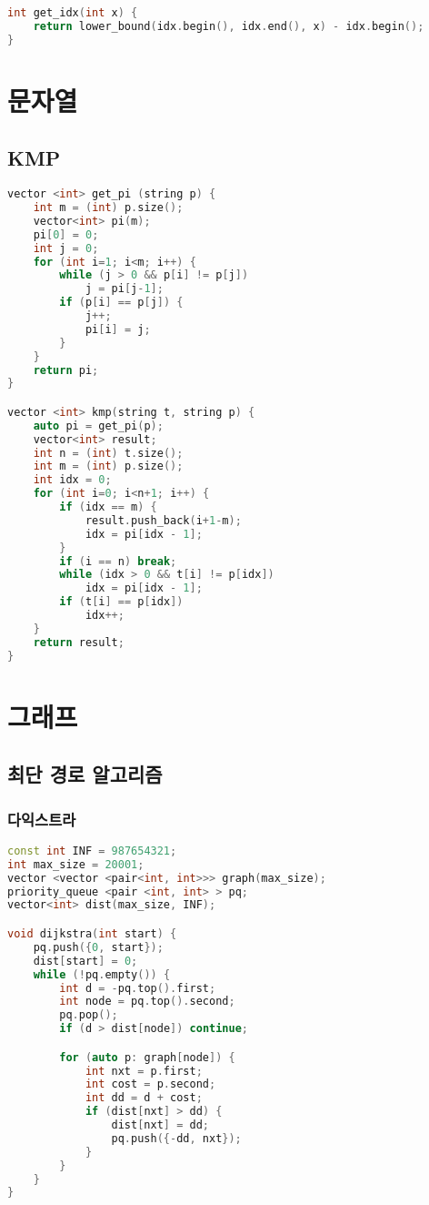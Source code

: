 \documentclass[]{article}
\begin{document}
\begin{multicols*}{2}
\begin{lstlisting}[language=c++]
int get_idx(int x) {
    return lower_bound(idx.begin(), idx.end(), x) - idx.begin();
}
\end{lstlisting}
\section{문자열}
\subsection{KMP}
\begin{lstlisting}[language=c++]
vector <int> get_pi (string p) {
    int m = (int) p.size();
    vector<int> pi(m);
    pi[0] = 0;
    int j = 0;
    for (int i=1; i<m; i++) {
        while (j > 0 && p[i] != p[j])
            j = pi[j-1];
        if (p[i] == p[j]) {
            j++;
            pi[i] = j;
        }
    }
    return pi;
}

vector <int> kmp(string t, string p) {
    auto pi = get_pi(p);
    vector<int> result;
    int n = (int) t.size();
    int m = (int) p.size();
    int idx = 0;
    for (int i=0; i<n+1; i++) {
        if (idx == m) {
            result.push_back(i+1-m);
            idx = pi[idx - 1];
        }
        if (i == n) break;
        while (idx > 0 && t[i] != p[idx])
            idx = pi[idx - 1];
        if (t[i] == p[idx])
            idx++;
    }
    return result;
}
\end{lstlisting}
\vskip 40mm
\columnbreak
\section{그래프}
\subsection{최단 경로 알고리즘}
\subsubsection{다익스트라}
\begin{lstlisting}[language=c++]
const int INF = 987654321;
int max_size = 20001;
vector <vector <pair<int, int>>> graph(max_size);
priority_queue <pair <int, int> > pq;
vector<int> dist(max_size, INF);

void dijkstra(int start) {
    pq.push({0, start});
    dist[start] = 0;
    while (!pq.empty()) {
        int d = -pq.top().first;
        int node = pq.top().second;
        pq.pop();
        if (d > dist[node]) continue;

        for (auto p: graph[node]) {
            int nxt = p.first;
            int cost = p.second;
            int dd = d + cost;
            if (dist[nxt] > dd) {
                dist[nxt] = dd;
                pq.push({-dd, nxt});
            }
        }
    }
}
\end{lstlisting}

\end{multicols*}
\end{document}

